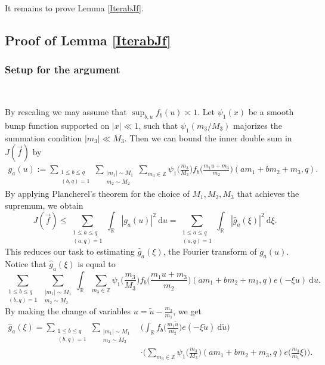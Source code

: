 \documentclass[12pt]{amsart}
\theoremstyle{definition}
\theoremstyle{plain}
\theoremstyle{remark}
\numberwithin{equation}{section}
\numberwithin{theorem}{section}
\numberwithin{equation}{section}
\begin{document}
	It remains to prove Lemma \ref{IterabJf}.
	
	\subsection{Proof of Lemma \ref{IterabJf}}\label{affsub}
	
	\subsubsection{Setup for the argument}\label{affsub1}
	
	\
	
	By rescaling we may assume that $\sup_{b,u}f_{b}(u) \asymp 1$. Let $\psi_{1}(x)$ be a smooth bump function supported on $|x| \ll 1$, such that $\psi_{1}(m_{3}/M_{3})$ majorizes the summation condition $|m_{3}| \ll M_{3}$. Then we can bound the inner double sum in $J(\overrightarrow{f})$ by
	\begin{align*}
		g_{a}(u):= \sum_{\substack{1 \leq b \leq q \\ (b, q)=1}}\sum_{\substack{|m_{1}|\sim M_{1} \\ m_{2}\sim M_{2}}}\sum_{m_{3} \in \mathbb{Z}}\psi_{1}\bigg(\frac{m_{3}}{M_{3}}\bigg)f_{b}\bigg(\frac{m_{1}u+m_{3}}{m_{2}}\bigg)(am_{1}+bm_{2}+m_{3}, q).
	\end{align*}
	By applying Plancherel's theorem for the choice of $M_{1}, M_{2}, M_{3}$ that achieves the supremum, we obtain
	\[J(\overrightarrow{f}) \leq \sum_{\substack{1 \leq a \leq q \\ (a, q)=1}}\int_{\mathbb{R}}|g_{a}(u)|^{2}\:\mathrm{d}u
	= \sum_{\substack{1 \leq a \leq q \\ (a, q)=1}}\int_{\mathbb{R}} |\hat{g}_{a}(\xi)|^{2}\:\mathrm{d}\xi.\]
	This reduces our task to estimating  $\hat{g}_{a}(\xi)$, the Fourier transform of $g_a(u)$. Notice that $\hat{g}_{a}(\xi)$ is equal to
	\[\sum_{\substack{1 \leq b \leq q \\ (b, q)=1}}\sum_{\substack{|m_{1}|\sim M_{1} \\ m_{2}\sim M_{2}}}\int_{\mathbb{R}}\sum_{m_{3} \in \mathbb{Z}}\psi_{1}\bigg(\frac{m_{3}}{M_{3}}\bigg)f_{b}\bigg(\frac{m_{1}u+m_{3}}{m_{2}}\bigg)(am_{1}+bm_{2}+m_{3}, q)e(-\xi u) \:\mathrm{d}u.\]
	By making the change of variables $u=\tilde{u}-\frac{m_{3}}{m_{1}}$, we get
	\begin{align*}
		\hat{g}_{a}(\xi)=\sum_{\substack{1 \leq b \leq q \\ (b, q)=1}}\sum_{\substack{|m_{1}|\sim M_{1} \\ m_{2}\sim M_{2}}}&\bigg(\int_{\mathbb{R}}
		f_{b}\bigg(\frac{m_{1}\tilde{u}}{m_{2}}\bigg)e(-\xi \tilde{u})\:\mathrm{d}\tilde{u}\bigg)
		\\
		&\cdot \bigg(\sum_{m_{3} \in \mathbb{Z}}\psi_{1}\bigg(\frac{m_{3}}{M_{3}}\bigg)(am_{1}+bm_{2}+m_{3}, q)e\bigg(\frac{m_{3}}{m_{1}}\xi\bigg)\bigg).
	\end{align*}
\end{document}
